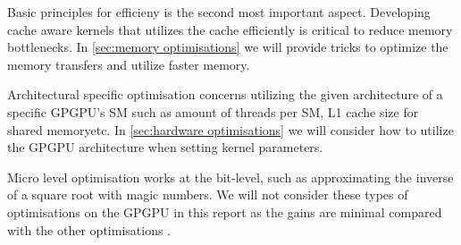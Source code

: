 Basic principles for efficieny is the second most important aspect.
Developing cache aware kernels that utilizes the cache efficiently is critical to reduce memory bottlenecks.
In \cref{sec:memory optimisations} we will provide tricks to optimize the memory transfers and utilize faster memory.

Architectural specific optimisation concerns utilizing the given architecture of a specific GPGPU's SM such as amount of threads per SM, L1 cache size for shared memoryetc.
In \cref{sec:hardware optimisations} we will consider how to utilize the GPGPU architecture when setting kernel parameters.

Micro level optimisation works at the bit-level, such as approximating the inverse of a square root with magic numbers.
We will not consider these types of optimisations on the GPGPU in this report as the gains are minimal compared with the other optimisations \cite{udacity}.
